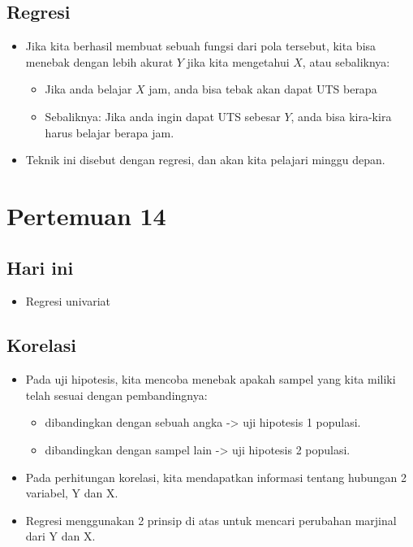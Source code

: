 \documentclass[
  letterpaper,
  DIV=11,
  numbers=noendperiod]{scrartcl}
\providecommand{\tightlist}{%
  \setlength{\itemsep}{0pt}\setlength{\parskip}{0pt}}\usepackage{longtable,booktabs,array}
\begin{document}
\subsection{Regresi}\label{regresi}

\begin{itemize}
\item
  Jika kita berhasil membuat sebuah fungsi dari pola tersebut, kita bisa
  menebak dengan lebih akurat \(Y\) jika kita mengetahui \(X\), atau
  sebaliknya:

  \begin{itemize}
  \item
    Jika anda belajar \(X\) jam, anda bisa tebak akan dapat UTS berapa
  \item
    Sebaliknya: Jika anda ingin dapat UTS sebesar \(Y\), anda bisa
    kira-kira harus belajar berapa jam.
  \end{itemize}
\item
  Teknik ini disebut dengan regresi, dan akan kita pelajari minggu
  depan.
\end{itemize}

\section{Pertemuan 14}\label{pertemuan-14}

\subsection{Hari ini}\label{hari-ini-4}

\begin{itemize}
\tightlist
\item
  Regresi univariat
\end{itemize}

\subsection{Korelasi}\label{korelasi-2}

\begin{itemize}
\item
  Pada uji hipotesis, kita mencoba menebak apakah sampel yang kita
  miliki telah sesuai dengan pembandingnya:

  \begin{itemize}
  \item
    dibandingkan dengan sebuah angka -\textgreater{} uji hipotesis 1
    populasi.
  \item
    dibandingkan dengan sampel lain -\textgreater{} uji hipotesis 2
    populasi.
  \end{itemize}
\item
  Pada perhitungan korelasi, kita mendapatkan informasi tentang hubungan
  2 variabel, Y dan X.
\item
  Regresi menggunakan 2 prinsip di atas untuk mencari perubahan marjinal
  dari Y dan X.
\end{itemize}
\end{document}
